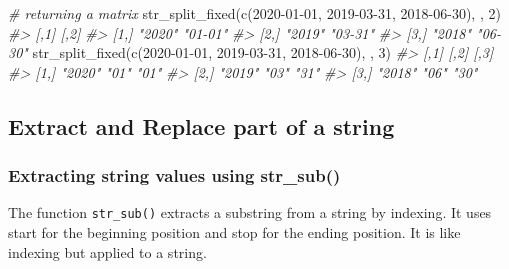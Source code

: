 \documentclass[
]{book}
\newenvironment{Shaded}{\begin{snugshade}}{\end{snugshade}}
\newcommand{\CommentTok}[1]{\textcolor[rgb]{0.56,0.35,0.01}{\textit{#1}}}
\newcommand{\DecValTok}[1]{\textcolor[rgb]{0.00,0.00,0.81}{#1}}
\newcommand{\FunctionTok}[1]{\textcolor[rgb]{0.00,0.00,0.00}{#1}}
\newcommand{\NormalTok}[1]{#1}
\newcommand{\StringTok}[1]{\textcolor[rgb]{0.31,0.60,0.02}{#1}}
\begin{document}
\begin{Shaded}
\begin{Highlighting}[]
\CommentTok{\# returning a matrix}
\FunctionTok{str\_split\_fixed}\NormalTok{(}\FunctionTok{c}\NormalTok{(}\StringTok{\textquotesingle{}2020{-}01{-}01\textquotesingle{}}\NormalTok{, }\StringTok{\textquotesingle{}2019{-}03{-}31\textquotesingle{}}\NormalTok{, }\StringTok{\textquotesingle{}2018{-}06{-}30\textquotesingle{}}\NormalTok{), }\StringTok{\textquotesingle{}{-}\textquotesingle{}}\NormalTok{, }\DecValTok{2}\NormalTok{)}
\CommentTok{\#\textgreater{}      [,1]   [,2]   }
\CommentTok{\#\textgreater{} [1,] "2020" "01{-}01"}
\CommentTok{\#\textgreater{} [2,] "2019" "03{-}31"}
\CommentTok{\#\textgreater{} [3,] "2018" "06{-}30"}
\FunctionTok{str\_split\_fixed}\NormalTok{(}\FunctionTok{c}\NormalTok{(}\StringTok{\textquotesingle{}2020{-}01{-}01\textquotesingle{}}\NormalTok{, }\StringTok{\textquotesingle{}2019{-}03{-}31\textquotesingle{}}\NormalTok{, }\StringTok{\textquotesingle{}2018{-}06{-}30\textquotesingle{}}\NormalTok{), }\StringTok{\textquotesingle{}{-}\textquotesingle{}}\NormalTok{, }\DecValTok{3}\NormalTok{)}
\CommentTok{\#\textgreater{}      [,1]   [,2] [,3]}
\CommentTok{\#\textgreater{} [1,] "2020" "01" "01"}
\CommentTok{\#\textgreater{} [2,] "2019" "03" "31"}
\CommentTok{\#\textgreater{} [3,] "2018" "06" "30"}
\end{Highlighting}
\end{Shaded}

\hypertarget{extract-and-replace-part-of-a-string}{%
\subsection{Extract and Replace part of a string}\label{extract-and-replace-part-of-a-string}}

\hypertarget{extracting-string-values-using-str_sub}{%
\subsubsection{Extracting string values using str\_sub()}\label{extracting-string-values-using-str_sub}}

The function \texttt{str\_sub()} extracts a substring from a string by indexing. It uses start for the beginning position and stop for the ending position. It is like indexing but applied to a string.
\end{document}
